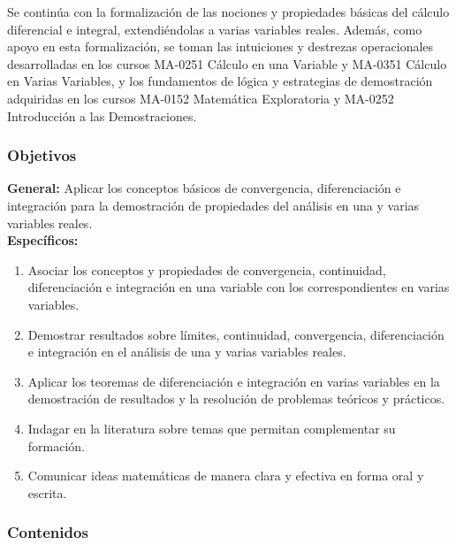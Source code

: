 \begin{refsection}
Se continúa con la formalización de las nociones y propiedades básicas del cálculo diferencial e integral, extendiéndolas a varias variables reales. Además, como apoyo en esta formalización, se toman las intuiciones y destrezas operacionales desarrolladas en los cursos MA-0251 Cálculo en una Variable y MA-0351 Cálculo en Varias Variables, y los fundamentos de lógica y estrategias de demostración adquiridas en los cursos MA-0152 Matemática Exploratoria y MA-0252 Introducción a las Demostraciones.





\subsubsection*{Objetivos}

\textbf{General:} Aplicar los conceptos básicos de convergencia, diferenciación e integración para la demostración de propiedades del análisis en una y varias variables reales. \\

\textbf{Específicos:}

\begin{enumerate}
\item Asociar los conceptos y propiedades de convergencia, continuidad, diferenciación e integración en una variable con los correspondientes en varias variables.
\item Demostrar resultados sobre límites, continuidad, convergencia, diferenciación e integración en el análisis de una y varias variables reales.
\item Aplicar los teoremas de diferenciación e integración en varias variables en la demostración de resultados y la resolución de problemas teóricos y prácticos.
\item Indagar en la literatura sobre temas que permitan complementar su formación.
\item Comunicar ideas matemáticas de manera clara y efectiva en forma oral y escrita.
\end{enumerate}

\subsubsection*{Contenidos}


\end{refsection}
